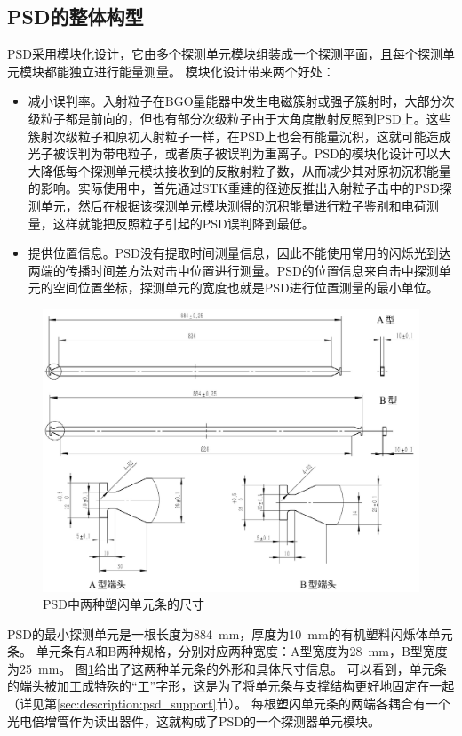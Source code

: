 \subsection{PSD的整体构型}
\label{sec:description:psd_composition}
PSD采用模块化设计，它由多个探测单元模块组装成一个探测平面，且每个探测单元模块都能独立进行能量测量。
模块化设计带来两个好处：
\begin{itemize}
	\item 减小误判率。入射粒子在BGO量能器中发生电磁簇射或强子簇射时，大部分次级粒子都是前向的，但也有部分次级粒子由于大角度散射反照到PSD上。这些簇射次级粒子和原初入射粒子一样，在PSD上也会有能量沉积，这就可能造成光子被误判为带电粒子，或者质子被误判为重离子。PSD的模块化设计可以大大降低每个探测单元模块接收到的反散射粒子数，从而减少其对原初沉积能量的影响。实际使用中，首先通过STK重建的径迹反推出入射粒子击中的PSD探测单元，然后在根据该探测单元模块测得的沉积能量进行粒子鉴别和电荷测量，这样就能把反照粒子引起的PSD误判降到最低。
	\item 提供位置信息。PSD没有提取时间测量信息，因此不能使用常用的闪烁光到达两端的传播时间差方法对击中位置进行测量。PSD的位置信息来自击中探测单元的空间位置坐标，探测单元的宽度也就是PSD进行位置测量的最小单位。
\end{itemize}

\begin{figure}[htb]
	\centering
	\includegraphics[width=\linewidth]{chap/description/fig/bars}
	\caption{PSD中两种塑闪单元条的尺寸}
	\label{fig:description:bars}
\end{figure}
PSD的最小探测单元是一根长度为\SI{884}{\milli\meter}，厚度为\SI{10}{\milli\meter}的有机塑料闪烁体单元条。
单元条有A和B两种规格，分别对应两种宽度：A型宽度为\SI{28}{\milli\meter}，B型宽度为\SI{25}{\milli\meter}。
图\ref{fig:description:bars}给出了这两种单元条的外形和具体尺寸信息。
可以看到，单元条的端头被加工成特殊的“工”字形，这是为了将单元条与支撑结构更好地固定在一起（详见第\ref{sec:description:psd_support}节）。
每根塑闪单元条的两端各耦合有一个光电倍增管作为读出器件，这就构成了PSD的一个探测器单元模块。

